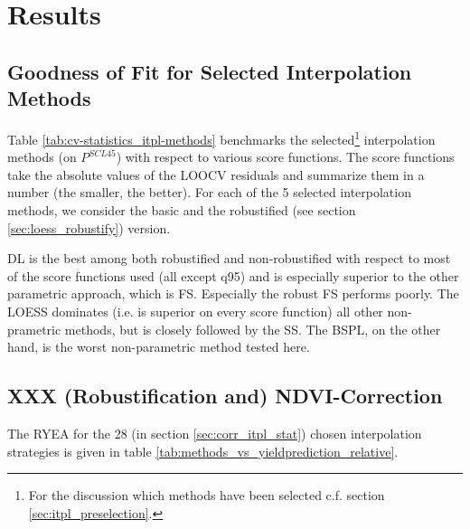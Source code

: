\chapter{Results}

\section{Goodness of Fit for Selected Interpolation Methods}{
	\label{sec:results_itpl}
	Table \ref{tab:cv-statistics_itpl-methods} benchmarks the selected\footnote{\label{note:selected-IM} For the discussion which methods have been selected c.f. section \ref{sec:itpl_preselection}.} interpolation methods (on $P^{SCL45}$) with respect to various score functions. The score functions take the absolute values of the LOOCV residuals and summarize them in a number (the smaller, the better). For each of the 5 selected interpolation methods, we consider the basic and the robustified (see section \ref{sec:loess_robustify}) version.

	\begin{table}[h]
		\begin{center}
			\caption{Comparing the goodness of fit for selected%
			interpolation methods (on $P^{SCL45}$) measured with the score functions (that take the LOOCV residuals as input) listed in the left column. $q_X$ denotes here the $X\%$ quantile.}
			\scriptsize
			
			\normalsize
			\label{tab:cv-statistics_itpl-methods}
		\end{center}
	\end{table}
	
	DL is the best among both robustified and non-robustified with respect to most of the score functions used (all except q95) and is especially superior to the other parametric approach, which is FS. Especially the robust FS performs poorly. The LOESS dominates (i.e. is superior on every score function) all other non-prametric methods, but is closely followed by the SS. The BSPL, on the other hand, is the worst non-parametric method tested here. 
}


\section{XXX (Robustification and) NDVI-Correction} \label{sec:results_ndvi_corr}
	The RYEA for the 28 (in section \ref{sec:corr_itpl_stat}) chosen interpolation strategies is given in table \ref{tab:methods_vs_yieldprediction_relative}. 

